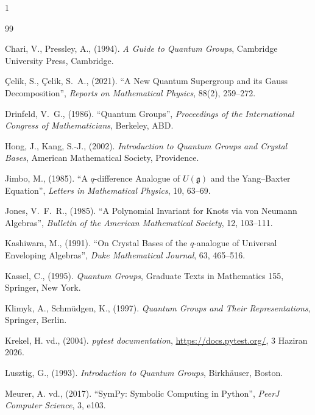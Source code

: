 \documentclass[12pt,a4paper,fleqn]{report}
\numberwithin{equation}{chapter}
\theoremstyle{plain}
\theoremstyle{definition}
\begin{document}
\FloatBarrier
\begin{spacing}{1}
\begin{thebibliography}{99}
\setlength{\itemsep}{6pt}

Chari, V., Pressley, A., (1994). \emph{A Guide to Quantum Groups}, Cambridge University Press, Cambridge.

Çelik, S., Çelik, S.~A., (2021). ``A New Quantum Supergroup and its Gauss Decomposition'', \emph{Reports on Mathematical Physics}, 88(2), 259--272.

Drinfeld, V.~G., (1986). ``Quantum Groups'', \emph{Proceedings of the International Congress of Mathematicians}, Berkeley, ABD.

Hong, J., Kang, S.-J., (2002). \emph{Introduction to Quantum Groups and Crystal Bases}, American Mathematical Society, Providence.

Jimbo, M., (1985). ``A $q$-difference Analogue of $U(\mathfrak{g})$ and the Yang--Baxter Equation'', \emph{Letters in Mathematical Physics}, 10, 63--69.

Jones, V.~F.~R., (1985). ``A Polynomial Invariant for Knots via von Neumann Algebras'', \emph{Bulletin of the American Mathematical Society}, 12, 103--111.

Kashiwara, M., (1991). ``On Crystal Bases of the $q$-analogue of Universal Enveloping Algebras'', \emph{Duke Mathematical Journal}, 63, 465--516.

Kassel, C., (1995). \emph{Quantum Groups}, Graduate Texts in Mathematics 155, Springer, New York.

Klimyk, A., Schmüdgen, K., (1997). \emph{Quantum Groups and Their Representations}, Springer, Berlin.

Krekel, H. vd., (2004). \emph{pytest documentation}, \url{https://docs.pytest.org/}, 3 Haziran 2026.

Lusztig, G., (1993). \emph{Introduction to Quantum Groups}, Birkhäuser, Boston.

Meurer, A. vd., (2017). ``SymPy: Symbolic Computing in Python'', \emph{PeerJ Computer Science}, 3, e103.

\end{thebibliography}
\end{spacing}
\end{document}
